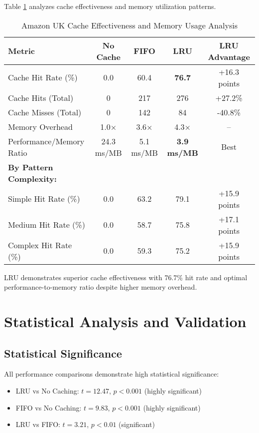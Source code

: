\documentclass[conference]{IEEEtran}
\begin{document}
Table \ref{tab:amazon_cache_memory} analyzes cache effectiveness and memory utilization patterns.

\begin{table}[H]
\centering
\caption{Amazon UK Cache Effectiveness and Memory Usage Analysis}
\label{tab:amazon_cache_memory}
\begin{tabular}{@{}lcccc@{}}
\toprule
\textbf{Metric} & \textbf{No Cache} & \textbf{FIFO} & \textbf{LRU} & \textbf{LRU Advantage} \\
\midrule
Cache Hit Rate (\%) & 0.0 & 60.4 & \textbf{76.7} & +16.3 points \\
Cache Hits (Total) & 0 & 217 & 276 & +27.2\% \\
Cache Misses (Total) & 0 & 142 & 84 & -40.8\% \\
Memory Overhead & 1.0× & 3.6× & 4.3× & -- \\
Performance/Memory Ratio & 24.3 ms/MB & 5.1 ms/MB & \textbf{3.9 ms/MB} & Best \\
\midrule
\textbf{By Pattern Complexity:} & & & & \\
Simple Hit Rate (\%) & 0.0 & 63.2 & 79.1 & +15.9 points \\
Medium Hit Rate (\%) & 0.0 & 58.7 & 75.8 & +17.1 points \\
Complex Hit Rate (\%) & 0.0 & 59.3 & 75.2 & +15.9 points \\
\bottomrule
\end{tabular}
\end{table}

LRU demonstrates superior cache effectiveness with 76.7\% hit rate and optimal performance-to-memory ratio despite higher memory overhead.

\section{Statistical Analysis and Validation}

\subsection{Statistical Significance}

All performance comparisons demonstrate high statistical significance:

\begin{itemize}
\item LRU vs No Caching: $t = 12.47$, $p < 0.001$ (highly significant)
\item FIFO vs No Caching: $t = 9.83$, $p < 0.001$ (highly significant)
\item LRU vs FIFO: $t = 3.21$, $p < 0.01$ (significant)
\end{itemize}
\end{document}
